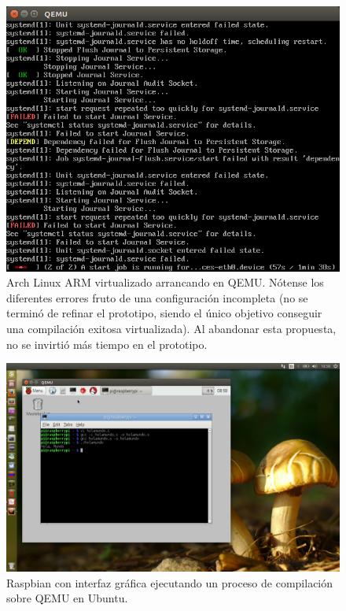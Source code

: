 \begin{figure}[H]
\centering
\includegraphics[height=0.3\textheight]{Chapters/Chapter5/Figures/qemu/arch-booting}
\caption[Arch Linux ARM virtualizado arrancando en QEMU]{Arch Linux ARM virtualizado arrancando en QEMU. Nótense los diferentes errores fruto de una configuración incompleta (no se terminó de refinar el prototipo, siendo el único objetivo conseguir una compilación exitosa virtualizada). Al abandonar esta propuesta, no se invirtió más tiempo en el prototipo.}
\end{figure}

\begin{figure}[H]
\centering
\includegraphics[height=0.3\textheight]{Chapters/Chapter5/Figures/qemu/raspbian-compiler}
\caption[Raspbian con interfaz gráfica ejecutando un proceso de compilación sobre QEMU]{Raspbian con interfaz gráfica ejecutando un proceso de compilación sobre QEMU en Ubuntu.}
\end{figure}

